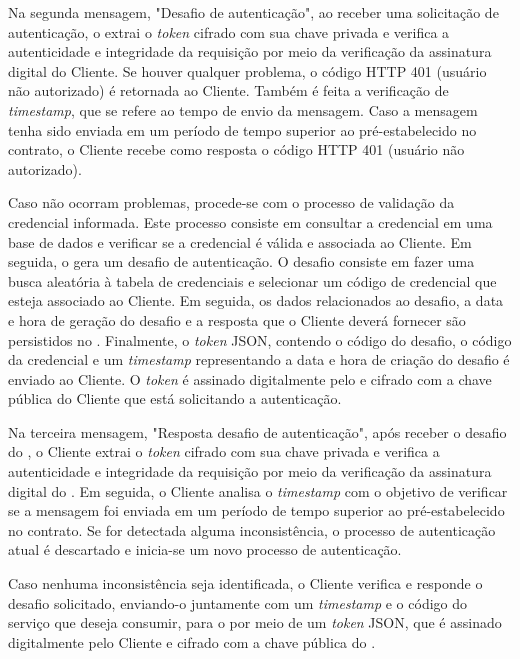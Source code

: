Na segunda mensagem, "Desafio de autenticação", ao receber uma solicitação de autenticação, o \servidorAA{} extrai o \emph{token} cifrado com sua chave privada e verifica a autenticidade e integridade da requisição por meio da verificação da assinatura digital do Cliente. Se houver qualquer problema, o código HTTP 401 (usuário não autorizado) é retornada ao Cliente.
Também é feita a verificação de \emph{timestamp}, que se refere ao tempo de envio da mensagem. Caso a mensagem tenha
sido enviada em um período de tempo superior ao pré-estabelecido no contrato, o Cliente recebe como resposta o código HTTP 401 (usuário não autorizado).

Caso não ocorram problemas, procede-se com o processo de validação da credencial informada. Este processo consiste em consultar a credencial em uma base de dados e verificar se a credencial é válida e associada ao Cliente. Em seguida, o \servidorAA{} gera um desafio de autenticação. O desafio consiste em fazer uma busca aleatória à tabela de credenciais e selecionar um código de credencial que esteja associado ao Cliente. Em seguida, os dados relacionados ao desafio, a data e hora de geração do desafio e a resposta que o Cliente deverá fornecer são persistidos no \servidorBD{}. Finalmente, o \emph{token} JSON, contendo o código do desafio, o código da credencial e um \emph{timestamp} representando a data e hora de criação do desafio é enviado ao Cliente. O \emph{token} é assinado digitalmente pelo \servidorAA{} e cifrado com a chave pública do Cliente que está solicitando a autenticação.

Na terceira mensagem, "Resposta desafio de autenticação", após receber o desafio do \servidorAA{}, o Cliente extrai o \emph{token} cifrado com sua chave privada e verifica a autenticidade e integridade da requisição por meio da verificação da assinatura digital do \servidorAA{}.
Em seguida, o Cliente analisa o \emph{timestamp} com o objetivo de verificar se a mensagem foi enviada em um período de tempo superior ao pré-estabelecido no contrato. Se for detectada alguma inconsistência, o processo de autenticação atual é descartado e inicia-se um novo processo de autenticação.

Caso nenhuma inconsistência seja identificada, o Cliente verifica e responde o desafio solicitado, enviando-o
juntamente com um \emph{timestamp} e o código do serviço que deseja consumir, para o \servidorAA{} por meio de um \emph{token} JSON, que é assinado digitalmente pelo Cliente e cifrado com a chave pública do \servidorAA{}.

